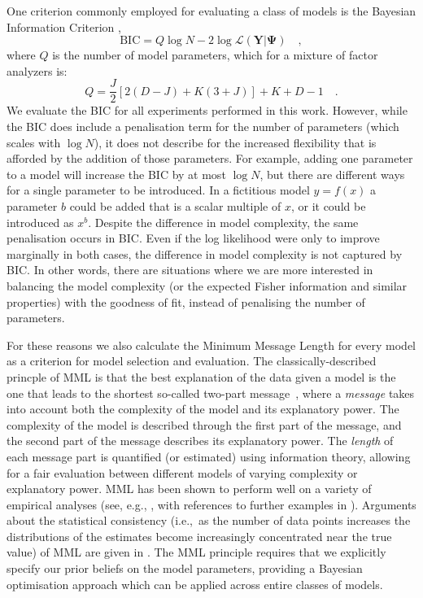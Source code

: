 \documentclass[twocolumn]{aastex62}
\newcommand{\vect}[1]{\boldsymbol{\mathbf{#1}}}
\renewcommand{\vec}[1]{\vect{#1}}
\newcommand{\data}{\textbf{Y}}
\newcommand{\NumDimensions}{D}
\newcommand{\NumLatentFactors}{J}
\newcommand{\NumComponents}{K}
\begin{document}
One criterion commonly employed for evaluating a class of models is the 
Bayesian Information Criterion \citep[BIC;][]{Schwarz:1978}, 
\begin{equation}
	\textrm{BIC} = Q\log{N} - 2\log\mathcal{L}\left(\data|\vec\Psi\right) \quad , \label{eq:bic}
\end{equation} 
\noindent{}where $Q$ is the number of model parameters, which for a mixture of
factor analyzers is:
\begin{equation}
	Q = \frac{\NumLatentFactors}{2}\left[2\left(\NumDimensions - \NumLatentFactors\right) + \NumComponents\left(3 + \NumLatentFactors\right)\right] + \NumComponents + \NumDimensions - 1 \quad .
\end{equation}
\noindent{}We evaluate the BIC for all experiments performed in this work.
However, while the BIC does include a penalisation term for the number of
parameters (which scales with $\log{N}$), it does not describe for the
increased flexibility that is afforded by the addition of those parameters.
For example, adding one parameter
to a model will increase the BIC by at most $\log{N}$, but there are different
ways for a single parameter to be introduced. In a fictitious model $y=f(x)$
a parameter $b$ could be added that is a scalar multiple of $x$, or it could be
introduced as $x^b$. Despite the difference in model complexity, the same
penalisation occurs in BIC. Even if the log likelihood were only to improve
marginally in both cases, the difference in model complexity is not captured
by BIC. In other words, there are situations where we are more interested in
balancing the model complexity (or the expected Fisher information and similar
properties) with the goodness of fit, instead of penalising the number of 
parameters.


For these reasons we also calculate the Minimum Message Length \citep[MML;][]{Wallace:2005}
for every model as a criterion for model selection and evaluation. 
The classically-described princple of MML is that the best explanation of the
data given a model is the one that leads to the shortest so-called two-part message~\citep{Wallace:2005}, 
where a \textit{message} takes into account both the complexity of the model 
and its explanatory power. The complexity of the model is described through
the first part of the message, and the second part of the message describes
its explanatory power. The \emph{length} of each message part is quantified
(or estimated) using information theory, allowing for a fair evaluation between
different models of varying complexity or explanatory power. MML has been 
shown to perform well on a variety of empirical analyses (see, e.g., 
\cite{viswanathan1999finding,fitzgibbon2004minimum}, with references to 
further examples in \cite{Wallace:2005,dowe2007bayes,Dowe2008a,Dowe2011a}).
Arguments about the statistical consistency (i.e.,~as the number of data 
points increases the distributions of the estimates become increasingly 
concentrated near the true value) of MML are given in \cite{DoweWallace1997a,Dowe2011a}.
The MML principle requires that we explicitly specify our prior beliefs on the
model parameters, providing a Bayesian optimisation approach which can be
applied across entire classes of models.
\end{document}
